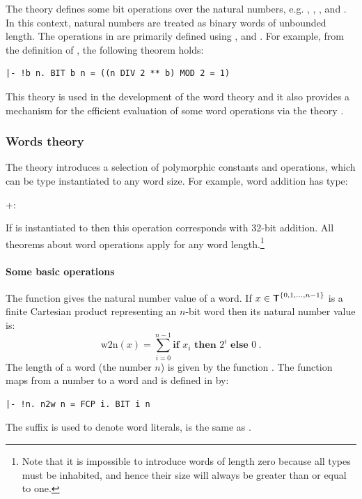 {The theory  defines some bit operations over the natural numbers,
e.g. , , ,  and
. In this context, natural numbers are treated as binary words of
unbounded length.  The operations in  are primarily defined using ,  and .  For example, from the definition of , the following theorem holds:
\begin{hol}
\begin{verbatim}
|- !b n. BIT b n = ((n DIV 2 ** b) MOD 2 = 1)
\end{verbatim}
\end{hol}

This theory is used in the development of the word theory and it also provides
a mechanism for the efficient evaluation of some word operations via the theory
.

\subsubsection{Words theory}

The theory  introduces a selection of polymorphic constants and operations, which can be type instantiated to any word size.  For example, word addition
has type:
\begin{hol}
+:\worda\rarr\worda\rarr\worda
\end{hol}
If  is instantiated to  then this operation corresponds with 32-bit addition.
All theorems about word operations apply for any word length.\footnote{Note
that it is impossible to introduce words of length zero because all types
must be inhabited, and hence their size will always be greater than or equal to
one.}

\paragraph{Some basic operations}

The function  gives the natural number value of a
word.  If $x\in\mbox{${\sf T}\!\!\!\!{\sf T}$}^{\{0, 1, \ldots, n - 1\}}$ is a finite Cartesian product
representing an $n$-bit word then its natural number value is:
\[ \mathrm{w2n}(x) = \sum_{i = 0}^{n - 1} \textbf{if } x_i \textbf{ then } 2^i
\textbf{ else } 0\ .\]
The length of a word (the number $n$) is given by the function
.
The function  maps from a number to a word and is
defined in \HOL{} by:
\begin{hol}
\begin{verbatim}
|- !n. n2w n = FCP i. BIT i n
\end{verbatim}
\end{hol}
The suffix  is used to denote word literals, \eg{}
 is the same as .

}
